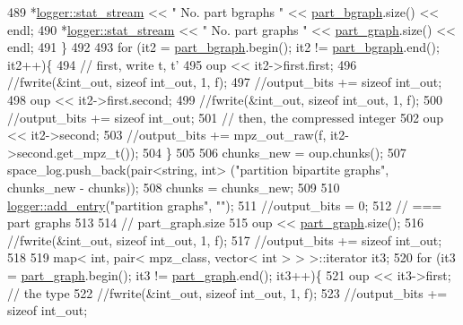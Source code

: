 \begin{DoxyCode}
489     *\hyperlink{classlogger_a7db37821f875f2ba3540980b355779f5}{logger::stat\_stream} << \textcolor{stringliteral}{" No. part bgraphs  "} << 
      \hyperlink{classmarked__graph__compressed_a7b3267063fba30b45eb21b3ba4e07536}{part\_bgraph}.size() << endl;
490     *\hyperlink{classlogger_a7db37821f875f2ba3540980b355779f5}{logger::stat\_stream} << \textcolor{stringliteral}{" No. part graphs   "} << 
      \hyperlink{classmarked__graph__compressed_ae179a4737e6eab905c18a94d44ef64b7}{part\_graph}.size() << endl;
491   \}
492 
493   \textcolor{keywordflow}{for} (it2 = \hyperlink{classmarked__graph__compressed_a7b3267063fba30b45eb21b3ba4e07536}{part\_bgraph}.begin(); it2 != \hyperlink{classmarked__graph__compressed_a7b3267063fba30b45eb21b3ba4e07536}{part\_bgraph}.end(); it2++)\{
494     \textcolor{comment}{// first, write t, t'}
495     oup << it2->first.first;
496     \textcolor{comment}{//fwrite(&int\_out, sizeof int\_out, 1, f);}
497     \textcolor{comment}{//output\_bits += sizeof int\_out;}
498     oup <<  it2->first.second;
499     \textcolor{comment}{//fwrite(&int\_out, sizeof int\_out, 1, f);}
500     \textcolor{comment}{//output\_bits += sizeof int\_out;}
501     \textcolor{comment}{// then, the compressed integer}
502     oup << it2->second;
503     \textcolor{comment}{//output\_bits += mpz\_out\_raw(f, it2->second.get\_mpz\_t());}
504   \}
505 
506   chunks\_new = oup.chunks();
507   space\_log.push\_back(pair<string, int> (\textcolor{stringliteral}{"partition bipartite graphs"}, chunks\_new - chunks));
508   chunks = chunks\_new;
509 
510   \hyperlink{classlogger_a710163deb17bc81f70d53d285b8ac9ac}{logger::add\_entry}(\textcolor{stringliteral}{"partition graphs"}, \textcolor{stringliteral}{""});
511   \textcolor{comment}{//output\_bits = 0;}
512   \textcolor{comment}{// === part graphs}
513 
514   \textcolor{comment}{// part\_graph.size}
515   oup <<  \hyperlink{classmarked__graph__compressed_ae179a4737e6eab905c18a94d44ef64b7}{part\_graph}.size();
516   \textcolor{comment}{//fwrite(&int\_out, sizeof int\_out, 1, f);}
517   \textcolor{comment}{//output\_bits += sizeof int\_out;}
518 
519   map< int, pair< mpz\_class, vector< int > > >::iterator it3;
520   \textcolor{keywordflow}{for} (it3 = \hyperlink{classmarked__graph__compressed_ae179a4737e6eab905c18a94d44ef64b7}{part\_graph}.begin(); it3 != \hyperlink{classmarked__graph__compressed_ae179a4737e6eab905c18a94d44ef64b7}{part\_graph}.end(); it3++)\{
521     oup <<  it3->first; \textcolor{comment}{// the type}
522     \textcolor{comment}{//fwrite(&int\_out, sizeof int\_out, 1, f);}
523     \textcolor{comment}{//output\_bits += sizeof int\_out;}

\end{DoxyCode}
